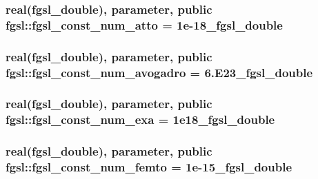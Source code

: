 \hypertarget{classfgsl_aca23ff810481681a4329c406eb3c4bbc}{
\subsubsection[{fgsl\-\_\-const\-\_\-num\-\_\-atto}]{\setlength{\rightskip}{0pt plus 5cm}real({\bf fgsl\-\_\-double}), parameter, public fgsl\-::fgsl\-\_\-const\-\_\-num\-\_\-atto = 1e-\/18\-\_\-fgsl\-\_\-double}}\label{classfgsl_aca23ff810481681a4329c406eb3c4bbc}
\hypertarget{classfgsl_a009cf79cdb578326cbceea51aa302e53}{
\subsubsection[{fgsl\-\_\-const\-\_\-num\-\_\-avogadro}]{\setlength{\rightskip}{0pt plus 5cm}real({\bf fgsl\-\_\-double}), parameter, public fgsl\-::fgsl\-\_\-const\-\_\-num\-\_\-avogadro = 6.\-E23\-\_\-fgsl\-\_\-double}}\label{classfgsl_a009cf79cdb578326cbceea51aa302e53}
\hypertarget{classfgsl_a0d6878f336ffcf4aaf3af66bbdfc5a9b}{
\subsubsection[{fgsl\-\_\-const\-\_\-num\-\_\-exa}]{\setlength{\rightskip}{0pt plus 5cm}real({\bf fgsl\-\_\-double}), parameter, public fgsl\-::fgsl\-\_\-const\-\_\-num\-\_\-exa = 1e18\-\_\-fgsl\-\_\-double}}\label{classfgsl_a0d6878f336ffcf4aaf3af66bbdfc5a9b}
\hypertarget{classfgsl_a3ab8d745c9129ec33f7556e68234b60b}{
\subsubsection[{fgsl\-\_\-const\-\_\-num\-\_\-femto}]{\setlength{\rightskip}{0pt plus 5cm}real({\bf fgsl\-\_\-double}), parameter, public fgsl\-::fgsl\-\_\-const\-\_\-num\-\_\-femto = 1e-\/15\-\_\-fgsl\-\_\-double}}\label{classfgsl_a3ab8d745c9129ec33f7556e68234b60b}
